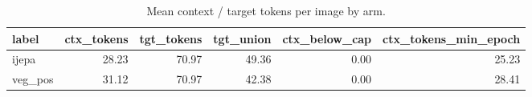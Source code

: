 \begin{table}[t]
\centering
\small
\caption{Mean context / target tokens per image by arm.}
\label{tab:token_budget}
\begin{tabular}{lrrrrr}
\toprule
label & ctx\_tokens & tgt\_tokens & tgt\_union & ctx\_below\_cap & ctx\_tokens\_min\_epoch \\
\midrule
ijepa & 28.23 & 70.97 & 49.36 & 0.00 & 25.23 \\
veg\_pos & 31.12 & 70.97 & 42.38 & 0.00 & 28.41 \\
\bottomrule
\end{tabular}
\end{table}
